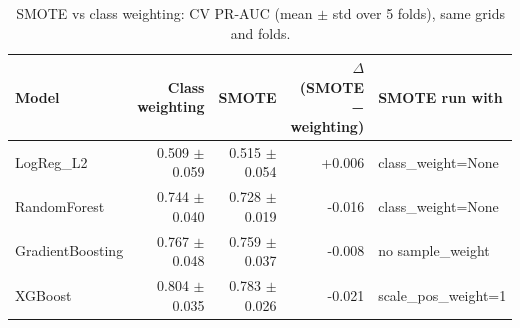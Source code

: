 \begin{table}[ht]
\centering
\small
\caption{SMOTE vs class weighting: CV PR-AUC (mean $\pm$ std over 5 folds), same grids and folds.}
\label{tab:smote}
\begin{tabular}{lrrrl}
\toprule
Model & Class weighting & SMOTE & $\Delta$ (SMOTE − weighting) & SMOTE run with \\
\midrule
LogReg\_L2 & 0.509 $\pm$ 0.059 & 0.515 $\pm$ 0.054 & +0.006 & class\_weight=None \\
RandomForest & 0.744 $\pm$ 0.040 & 0.728 $\pm$ 0.019 & -0.016 & class\_weight=None \\
GradientBoosting & 0.767 $\pm$ 0.048 & 0.759 $\pm$ 0.037 & -0.008 & no sample\_weight \\
XGBoost & 0.804 $\pm$ 0.035 & 0.783 $\pm$ 0.026 & -0.021 & scale\_pos\_weight=1 \\
\bottomrule
\end{tabular}
\end{table}
